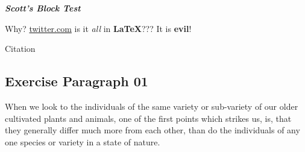 \textit{\textbf{Scott's Block Test}} 

Why? \href{Why}{twitter.com} is it \textit{all} in \textbf{LaTeX}??? It is \textbf{evil}!

Citation\cite{Ferry_2006}

\subsection{Exercise Paragraph 01}

When we look to the individuals of the same variety or sub-variety of our older cultivated plants and animals, one of the first points which strikes us, is, that they generally differ much more from each other, than do the individuals of any one species or variety in a state of nature.